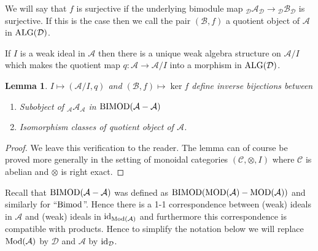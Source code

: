 \documentclass{amsproc}
\def\Ascr{{\mathcal A}}
\def\Bscr{{\mathcal B}}
\def\Cscr{{\mathcal C}}
\def\Dscr{{\mathcal D}}
\def\Id{\text{id}}
\def\Mod{\mathop{\text{Mod}}}
\def\MOD{\mathop{\text{MOD}}}
\def\Bimod{\mathop{\text{Bimod}}}
\def\BIMOD{\mathop{\text{BIMOD}}}
\def\ALG{\mathop{\text{ALG}}}
\def\ker{\operatorname {ker}}
\def\r{\rightarrow}
\let\oldtext\text
\def\text#1{\oldtext{\upshape #1}}
\newtheorem{lemmas}{Lemma}[subsection]
\theoremstyle{definition}
\theoremstyle{remark}
\numberwithin{equation}{section}
\numberwithin{table}{section}
\numberwithin{figure}{section}
\begin{document}
We will say that  $f$ is surjective if the underlying bimodule map
${}_\Dscr\Ascr_\Dscr\r {}_\Dscr \Bscr_\Dscr$ is surjective. If this is the case
then we call the pair $(\Bscr,f)$ a quotient object of $\Ascr$ in
$\ALG(\Dscr)$. 

If $I$ is a weak ideal in $\Ascr$ then there is a  unique weak algebra
structure on $\Ascr/I$ which makes the quotient map $q:\Ascr\r \Ascr/I$ into a
morphism in $\ALG(\Dscr)$.
\begin{lemmas}
$I\mapsto (\Ascr/I,q)$ and $(\Bscr,f)\mapsto \ker f$ define inverse bijections
between
\begin{enumerate}
\item
Subobject of ${}_\Ascr\Ascr_\Ascr$ in $\BIMOD(\Ascr-\Ascr)$
\item
Isomorphism classes of quotient object of $\Ascr$.
\end{enumerate}
\end{lemmas}
\begin{proof} We leave this verification to the reader. The lemma can of course
be proved more generally in the setting of monoidal categories
$(\Cscr,\otimes,I)$ where $\Cscr$ is abelian and $\otimes$ is right exact.
\end{proof}
Recall that $\BIMOD(\Ascr-\Ascr)$ was defined as
$\BIMOD(\MOD(\Ascr)-\MOD(\Ascr))$ and similarly for ``$\Bimod$''.
Hence there is a 1-1 correspondence between (weak) ideals in $\Ascr$
and (weak) ideals in $\Id_{\Mod(\Ascr)}$ and furthermore this
correspondence is compatible with products. Hence to simplify the
notation below we will replace   $\Mod(\Ascr)$ by $\Dscr$ and $\Ascr$ by
$\Id_\Dscr$.
\end{document}
